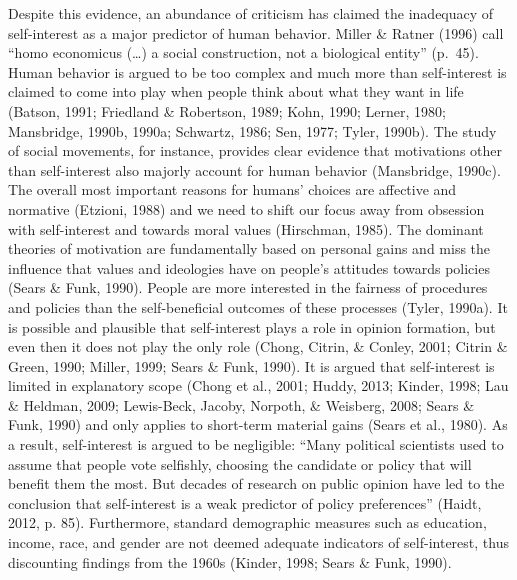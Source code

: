 \documentclass[12pt,econ]{sources/authesis}
\begin{document}
Despite this evidence, an abundance of criticism has claimed the inadequacy of self-interest as a major predictor of human behavior. Miller \& Ratner (1996) call ``homo economicus (\ldots) a social construction, not a biological entity'' (p.~45). Human behavior is argued to be too complex and much more than self-interest is claimed to come into play when people think about what they want in life (Batson, 1991; Friedland \& Robertson, 1989; Kohn, 1990; Lerner, 1980; Mansbridge, 1990b, 1990a; Schwartz, 1986; Sen, 1977; Tyler, 1990b). The study of social movements, for instance, provides clear evidence that motivations other than self-interest also majorly account for human behavior (Mansbridge, 1990c). The overall most important reasons for humans' choices are affective and normative (Etzioni, 1988) and we need to shift our focus away from obsession with self-interest and towards moral values (Hirschman, 1985). The dominant theories of motivation are fundamentally based on personal gains and miss the influence that values and ideologies have on people's attitudes towards policies (Sears \& Funk, 1990). People are more interested in the fairness of procedures and policies than the self-beneficial outcomes of these processes (Tyler, 1990a). It is possible and plausible that self-interest plays a role in opinion formation, but even then it does not play the only role (Chong, Citrin, \& Conley, 2001; Citrin \& Green, 1990; Miller, 1999; Sears \& Funk, 1990). It is argued that self-interest is limited in explanatory scope (Chong et al., 2001; Huddy, 2013; Kinder, 1998; Lau \& Heldman, 2009; Lewis-Beck, Jacoby, Norpoth, \& Weisberg, 2008; Sears \& Funk, 1990) and only applies to short-term material gains (Sears et al., 1980). As a result, self-interest is argued to be negligible: ``Many political scientists used to assume that people vote selfishly, choosing the candidate or policy that will benefit them the most. But decades of research on public opinion have led to the conclusion that self-interest is a weak predictor of policy preferences'' (Haidt, 2012, p. 85). Furthermore, standard demographic measures such as education, income, race, and gender are not deemed adequate indicators of self-interest, thus discounting findings from the 1960s (Kinder, 1998; Sears \& Funk, 1990).
\end{document}
